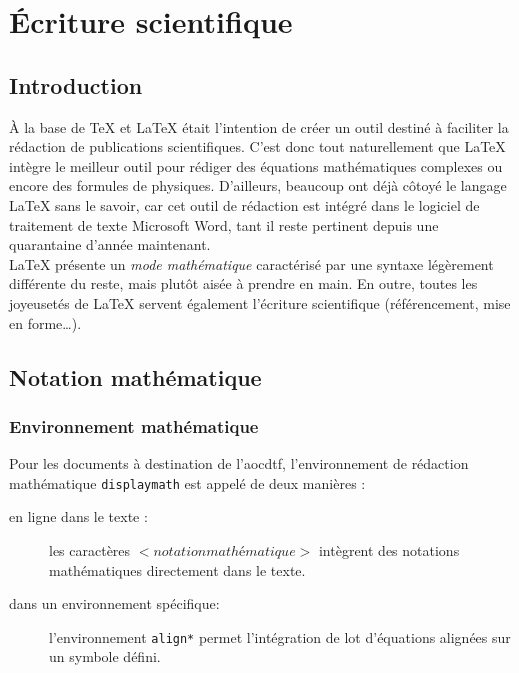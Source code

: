 \documentclass[a4paper, 11pt, twoside, fleqn]{memoir}
\begin{document}

\chapter{\'Ecriture scientifique}
	\ChapFrame %
	
	\section{Introduction}

À la base de \TeX{} et \LaTeX{} était l'intention de créer un outil destiné à faciliter la rédaction de publications scientifiques. C'est donc tout naturellement que \LaTeX{} intègre le meilleur outil pour rédiger des équations mathématiques complexes ou encore des formules de physiques. D'ailleurs, beaucoup ont déjà côtoyé le langage \LaTeX{} sans le savoir, car cet outil de rédaction est intégré dans le logiciel de traitement de texte Microsoft Word, tant il reste pertinent depuis une quarantaine d'année maintenant.\\

\LaTeX{} présente un \emph{mode mathématique} caractérisé par une syntaxe légèrement différente du reste, mais plutôt aisée à prendre en main. En outre, toutes les joyeusetés de \LaTeX{} servent également l'écriture scientifique (référencement, mise en forme\ldots).

	\section{Notation mathématique}
	
		\subsection{Environnement mathématique}

Pour les documents à destination de l'\gls{aocdtf}, l'environnement de rédaction mathématique \texttt{displaymath} est appelé de deux manières :
\begin{description}
\item [\og en ligne \fg{}  dans le texte :] les caractères \texttt{\( <notation mathématique> \)} intègrent des notations mathématiques directement dans le texte. 
\item [dans un environnement spécifique:] l'environnement \texttt{align*} permet l'intégration de lot d'équations alignées sur un symbole défini.
\end{description}
\end{document}
